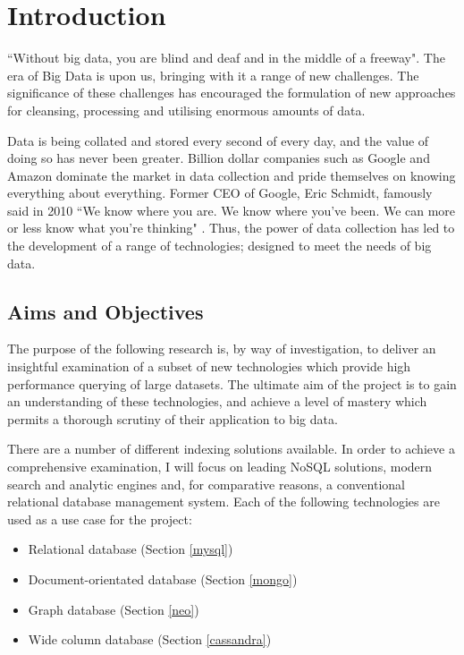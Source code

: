 \chapter*{Introduction}
``Without big data, you are blind and deaf and in the middle of a freeway"\cite{moore}. The era of Big Data is upon us, bringing with it a range of new challenges. The significance of these challenges has encouraged the formulation of new approaches for cleansing, processing and utilising enormous amounts of data.

Data is being collated and stored every second of every day, and the value of doing so has never been greater. Billion dollar companies such as Google and Amazon dominate the market in data collection and pride themselves on knowing everything about everything. Former CEO of Google, Eric Schmidt, famously said in 2010 ``We know where you are. We know where you've been. We can more or less know what you're thinking" \cite{schmidt}. Thus, the power of data collection has led to the development of a range of technologies; designed to meet the needs of big data.

\section{Aims and Objectives}\label{objectives}

The purpose of the following research is, by way of investigation, to deliver an insightful examination of a subset of new technologies which provide high performance querying of large datasets. The ultimate aim of the project is to gain an understanding of these technologies, and achieve a level of mastery which permits a thorough scrutiny of their application to big data.

There are a number of different indexing solutions available. In order to achieve a comprehensive examination, I will focus on leading NoSQL solutions, modern search and analytic engines and, for comparative reasons, a conventional relational database management system. Each of the following technologies are used as a use case for the project: 

\begin{itemize}
\item Relational database (Section \ref{mysql})
\item Document-orientated database (Section \ref{mongo})
\item Graph database (Section \ref{neo})
\item Wide column database (Section \ref{cassandra})
\end{itemize}

